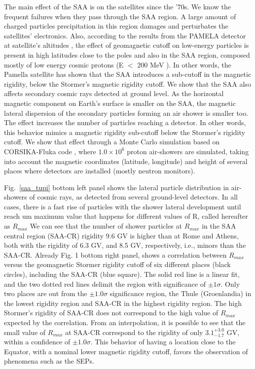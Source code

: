 \documentclass[twocolumn]{aastex63}
\begin{document}
The main effect of the SAA is on the satellites since
the '70s. We know the frequent failures when they pass
through the SAA region. A large amount of charged
particles precipitation in this region damages and perturbates
the satellites' electronics. Also, according to
the results from the PAMELA detector at satellite's altitudes
\citep{caso09}, the effect of geomagnetic cutoff on low-energy
particles is present in high latitudes close to the poles
and also in the SAA region, composed mostly of low energy
cosmic protons (E $<$ 200 MeV ). In other words, the
Pamella satellite has shown that the SAA introduces a
sub-cutoff in the magnetic rigidity, below the Stormer's
magnetic rigidity cutoff.
We show that the SAA also affects secondary cosmic
rays detected at ground level. As the horizontal magnetic
component on Earth's surface is smaller on the
SAA, the magnetic lateral dispersion of the secondary
particles forming an air shower is smaller too. The effect
increases the number of particles reaching a detector. In
other words, this behavior mimics a magnetic rigidity
sub-cutoff below the Stormer's rigidity cutoff.
We show that effect through a Monte Carlo simulation
based on CORSIKA-Fluka code \citep{heck12,batt08}, where $1.0 \times 10^6$ proton
air-showers are simulated, taking into account the magnetic
coordinates (latitude, longitude) and height of several
places where detectors are installed (mostly neutron
monitors).



Fig.~\ref{saa_tupi} bottom left panel shows the lateral particle distribution
in air-showers of cosmic rays, as detected from
several ground-level detectors. In all cases, there is a fast
rise of particles with the shower lateral development until
reach um maximum value that happens for different
values of R, called hereafter as $R_{max}$
We can see that the number of shower particles at
$R_{max}$ in the SAA central region (SAA-CR) rigidity 9.6
GV is higher than at Rome and Athens, both with the
rigidity of 6.3 GV, and 8.5 GV, respectively, i.e., minors
than the SAA-CR.
Already Fig. 1 bottom right panel, shows a correlation
between $R_{max}$ versus the geomagnetic Stormer rigidity
cutoff of six different places (black circles), including the
SAA-CR (blue square). The solid red line is a linear fit, and the two dotted red lines delimit the region with significance of $\pm 1 \sigma$.
Only two places are out from the $\pm 1.0 \sigma$ significance region, the Thule (Groenlandia) in the lowest rigidity region
and SAA-CR in the highest rigidity region. The
high Stormer's rigidity of SAA-CR does not correspond
to the high value of $R_{max}$ expected by the correlation.
From an interpolation, it is possible to see that the small
value of $R_{max}$ at SAA-CR correspond to the rigidity of
only $3.1^{+3.0}_{-1.7}$ GV, within a confidence of $\pm 1.0 \sigma$.
This behavior of having a location close to the Equator,
with a nominal lower magnetic rigidity cutoff, favors the
observation of phenomena such as the SEPs.
\end{document}
